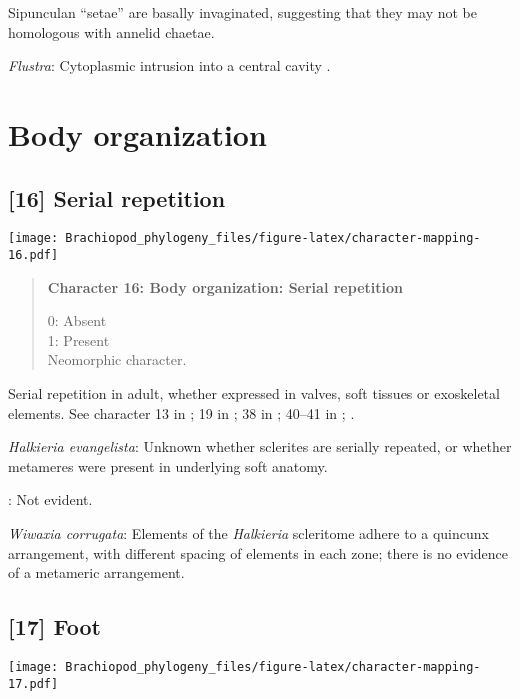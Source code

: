 \documentclass[openany]{book}
\theoremstyle{definition}
\theoremstyle{definition}
\theoremstyle{definition}
\theoremstyle{remark}
\begin{document}
Sipunculan ``setae'' are basally invaginated, suggesting that they may
not be homologous with annelid chaetae.

\hypertarget{Flustra-coding-15}{}
\emph{Flustra}: Cytoplasmic intrusion into a central cavity
\citep{Gordon1975}.

\section{Body organization}\label{body-organization}

\subsection*{{[}16{]} Serial repetition}\label{serial-repetition}

\texttt{[image: Brachiopod\_phylogeny\_files/figure-latex/character-mapping-16.pdf]}

\begin{quote}
\textbf{Character 16: Body organization: Serial repetition}

0: Absent\\
1: Present\\
Neomorphic character.
\end{quote}

Serial repetition in adult, whether expressed in valves, soft tissues or
exoskeletal elements. See character 13 in \citet{Rouse1999}; 19 in
\citet{Vinther2008}; 38 in \citet{Haszprunar1996}; 40--41 in
\citet{Sutton2012}; \citet{Wanninger2009}.

\hypertarget{Halkieria_evangelista-coding-16}{}
\emph{Halkieria evangelista}: Unknown whether sclerites are serially
repeated, or whether metameres were present in underlying soft anatomy.

\hypertarget{TAXLABELS-coding-16}{}
: Not evident.

\hypertarget{Wiwaxia_corrugata-coding-16}{}
\emph{Wiwaxia corrugata}: Elements of the \emph{Halkieria} scleritome
adhere to a quincunx arrangement, with different spacing of elements in
each zone; there is no evidence of a metameric arrangement.

\subsection*{{[}17{]} Foot}\label{foot}

\texttt{[image: Brachiopod\_phylogeny\_files/figure-latex/character-mapping-17.pdf]}
\end{document}
